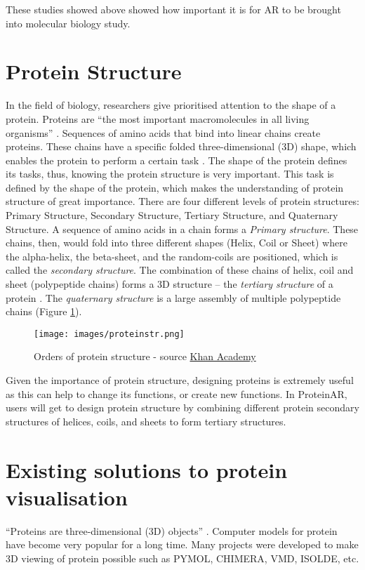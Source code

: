 These studies showed above showed how important it is for AR to be brought into molecular biology study.

\section{Protein Structure}

In the field of biology, researchers give prioritised attention to the shape of a protein. Proteins are “the most important macromolecules in all living organisms” \parencite{rashid_protein_nodate}. Sequences of amino acids that bind into linear chains create proteins. These chains have a specific folded three-dimensional (3D) shape, which enables the protein to perform a certain task \parencite{rashid_protein_nodate}. The shape of the protein defines its tasks, thus, knowing the protein structure is very important. This task is defined by the shape of the protein, which makes the understanding of protein structure of great importance. There are four different levels of protein structures: Primary Structure, Secondary Structure, Tertiary Structure, and Quaternary Structure. A sequence of amino acids in a chain forms a \emph{Primary structure}. These chains, then, would fold into three different shapes (Helix, Coil or Sheet) where the alpha-helix, the beta-sheet, and the random-coils are positioned, which is called the \emph{secondary structure}. The combination of these chains of helix, coil and sheet (polypeptide chains) forms a 3D structure – the \emph{tertiary structure} of a protein \parencite{rashid_protein_nodate}. The \emph{quaternary structure} is a large assembly of multiple polypeptide chains (Figure \ref{fig:proteinstr}).
 \begin{figure}[!htp]
	\centering
	\texttt{[image: images/proteinstr.png]}
	\caption{Orders of protein structure - source \href{https://www.khanacademy.org/science/biology/macromolecules/proteins-and-amino-acids/a/orders-of-protein-structure}{Khan Academy}\parencite{noauthor_introduction_nodate}}
	\label{fig:proteinstr}
\end{figure}

Given the importance of protein structure, designing proteins is extremely useful as this can help to change its functions, or create new functions. In ProteinAR, users will get to design protein structure by combining different protein secondary structures of helices, coils, and sheets to form tertiary structures.

\section{Existing solutions to protein visualisation}
 “Proteins are three-dimensional (3D) objects” \parencite{ratamero_touching_2018}. Computer models for protein have become very popular for a long time. Many projects were developed to make 3D viewing of protein possible such as {\footnotesize PYMOL, CHIMERA, VMD, ISOLDE,} etc. 
 
